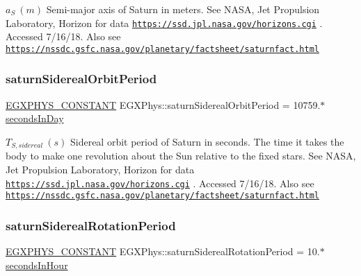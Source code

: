 $ a_{S} \ (m)$ Semi-\/major axis of Saturn in meters. See N\+A\+SA, Jet Propulsion Laboratory, Horizon for data \href{https://ssd.jpl.nasa.gov/horizons.cgi}{\tt https\+://ssd.\+jpl.\+nasa.\+gov/horizons.\+cgi} . Accessed 7/16/18. Also see \href{https://nssdc.gsfc.nasa.gov/planetary/factsheet/saturnfact.html}{\tt https\+://nssdc.\+gsfc.\+nasa.\+gov/planetary/factsheet/saturnfact.\+html} \mbox{\label{group___e_g_x_phys-_constants-_astrophysics-_solar_system-_saturn-_orbit_ga2616da281ffae469a063f75393e2ad92}} 
\subsubsection{\texorpdfstring{saturn\+Sidereal\+Orbit\+Period}{saturnSiderealOrbitPeriod}}
{\footnotesize\ttfamily \mbox{\hyperlink{group___e_g_x_phys-_constants-_macros_ga76980d288494ce1714c9ac68a95ba702}{E\+G\+X\+P\+H\+Y\+S\+\_\+\+C\+O\+N\+S\+T\+A\+NT}} E\+G\+X\+Phys\+::saturn\+Sidereal\+Orbit\+Period = 10759.$\ast$\mbox{\hyperlink{namespace_e_g_x_phys_a93d2a00d75411b58cbf63ab3fd1f8bc2}{seconds\+In\+Day}}}

$ T_{S,sidereal} \ (s)$ Sidereal orbit period of Saturn in seconds. The time it takes the body to make one revolution about the Sun relative to the fixed stars. See N\+A\+SA, Jet Propulsion Laboratory, Horizon for data \href{https://ssd.jpl.nasa.gov/horizons.cgi}{\tt https\+://ssd.\+jpl.\+nasa.\+gov/horizons.\+cgi} . Accessed 7/16/18. Also see \href{https://nssdc.gsfc.nasa.gov/planetary/factsheet/saturnfact.html}{\tt https\+://nssdc.\+gsfc.\+nasa.\+gov/planetary/factsheet/saturnfact.\+html} \mbox{\label{group___e_g_x_phys-_constants-_astrophysics-_solar_system-_saturn-_orbit_ga987e74b5ac7c96852919c3b7dd513e26}} 
\subsubsection{\texorpdfstring{saturn\+Sidereal\+Rotation\+Period}{saturnSiderealRotationPeriod}}
{\footnotesize\ttfamily \mbox{\hyperlink{group___e_g_x_phys-_constants-_macros_ga76980d288494ce1714c9ac68a95ba702}{E\+G\+X\+P\+H\+Y\+S\+\_\+\+C\+O\+N\+S\+T\+A\+NT}} E\+G\+X\+Phys\+::saturn\+Sidereal\+Rotation\+Period = 10.$\ast$\mbox{\hyperlink{namespace_e_g_x_phys_a7c3165cd93e36f1fb8e9fef80f117bef}{seconds\+In\+Hour}}}

